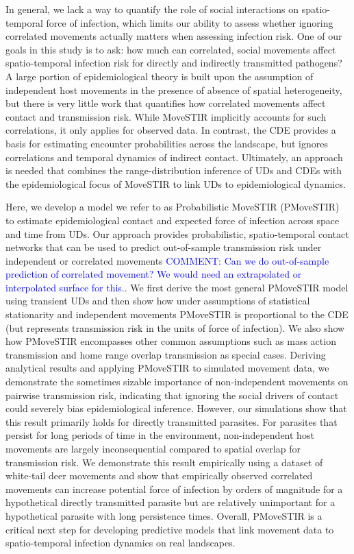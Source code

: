 \documentclass[letterpaper]{article}
\begin{document}
In general, we lack a way to quantify the role of social interactions on spatio-temporal force of infection, which limits our ability to assess whether ignoring correlated movements actually matters when assessing infection risk. One of our goals in this study is to ask: how much can correlated, social movements affect spatio-temporal infection risk for directly and indirectly transmitted pathogens? A large portion of epidemiological theory is built upon the assumption of independent host movements in the presence of absence of spatial heterogeneity, but there is very little work that quantifies how correlated movements affect contact and transmission risk. While MoveSTIR implicitly accounts for such correlations, it only applies for observed data. In contrast, the CDE provides a basis for estimating encounter probabilities across the landscape, but ignores correlations and temporal dynamics of indirect contact.
Ultimately, an approach is needed that combines the range-distribution inference of UDs and CDEs \citep{Alston2022,Noonan2021} with the epidemiological focus of MoveSTIR to link UDs to epidemiological dynamics. 

Here, we develop a model we refer to as Probabilistic MoveSTIR (PMoveSTIR) to estimate epidemiological contact and expected force of infection across space and time from UDs. Our approach provides probabilistic, spatio-temporal contact networks that can be used to predict out-of-sample transmission risk under independent or correlated movements \textcolor{blue}{COMMENT: Can we do out-of-sample prediction of correlated movement? We would need an extrapolated or interpolated surface for this.}. We first derive the most general PMoveSTIR model using transient UDs and then show how under assumptions of statistical stationarity and independent movements PMoveSTIR is proportional to the CDE (but represents transmission risk in the units of force of infection). We also show how PMoveSTIR encompasses other common assumptions such as mass action transmission and home range overlap transmission as special cases. Deriving analytical results and applying PMoveSTIR to simulated movement data, we demonstrate the sometimes sizable importance of non-independent movements on pairwise transmission risk, indicating that ignoring the social drivers of contact could severely bias epidemiological inference. However, our simulations show that this result primarily holds for directly transmitted parasites. For parasites that persist for long periods of time in the environment, non-independent host movements are largely inconsequential compared to spatial overlap for transmission risk. We demonstrate this result empirically using a dataset of white-tail deer movements and show that empirically observed correlated movements can increase potential force of infection by orders of magnitude for a hypothetical directly transmitted parasite but are relatively unimportant for a hypothetical parasite with long persistence times.  Overall, PMoveSTIR is a critical next step for developing predictive models that link movement data to spatio-temporal infection dynamics on real landscapes.
\end{document}
